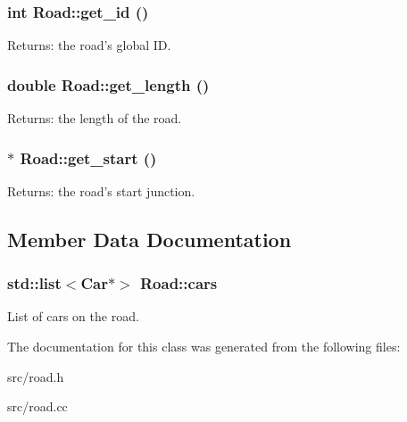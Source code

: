 \subsubsection{\setlength{\rightskip}{0pt plus 5cm}int Road::get\_\-id ()\hspace{0.3cm}{\tt  [inline]}}\label{classRoad_Roada2}


\begin{Desc}
\item[Returns:]the road's global ID.\end{Desc}
\subsubsection{\setlength{\rightskip}{0pt plus 5cm}double Road::get\_\-length ()\hspace{0.3cm}{\tt  [inline]}}\label{classRoad_Roada5}


\begin{Desc}
\item[Returns:]the length of the road.\end{Desc}
\subsubsection{$\ast$ Road::get\_\-start ()\hspace{0.3cm}{\tt  [inline]}}\label{classRoad_Roada3}


\begin{Desc}
\item[Returns:]the road's start junction.\end{Desc}


\subsection{Member Data Documentation}
\subsubsection{\setlength{\rightskip}{0pt plus 5cm}std::list$<$Car$\ast$$>$ {\bf Road::cars}}\label{classRoad_Roado0}


List of cars on the road. 



The documentation for this class was generated from the following files:\begin{CompactItemize}
\item 
src/road.h\item 
src/road.cc\end{CompactItemize}
